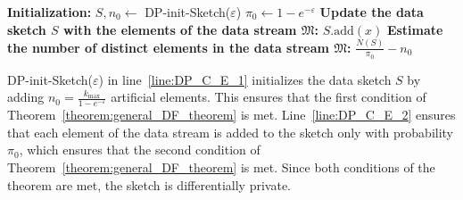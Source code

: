 \begin{algorithm}[htbp]
\caption{DP-cardinality-estimator($\mathfrak{M}$, $\varepsilon$)}
\label{alg:dp_cardinality}
\begin{algorithmic}[1]
\State \textbf{Initialization:}
\State $S, n_0 \gets$ DP-init-Sketch($\varepsilon$) \label{line:DP_C_E_1}
\State $\pi_0 \gets 1 - e^{-\varepsilon}$
\State
\State \textbf{Update the data sketch $S$ with the elements of the data stream $\mathfrak{M}$:}
     \Comment{hash $\mathcal{H}(x) \in [0, 1)$} \label{line:DP_C_E_2}
        \State $S.\mathrm{add}(x)$
    \EndIf
\EndFor
\State
\State \textbf{Estimate the number of distinct elements in the data stream $\mathfrak{M}$:}
\State \Return $\frac{N(S)}{\pi_0} - n_0$
\end{algorithmic}
\end{algorithm}

DP-init-Sketch($\varepsilon$) in line~\ref{line:DP_C_E_1} initializes the data sketch $S$ by adding $n_0 = \frac{k_{\max}}{1 - e^{-\varepsilon}}$ artificial elements. This ensures that the first condition of Theorem~\ref{theorem:general_DF_theorem} is met. Line~\ref{line:DP_C_E_2} ensures that each element of the data stream is added to the sketch only with probability $\pi_0$, which ensures that the second condition of Theorem~\ref{theorem:general_DF_theorem} is met. Since both conditions of the theorem are met, the sketch is differentially private.
